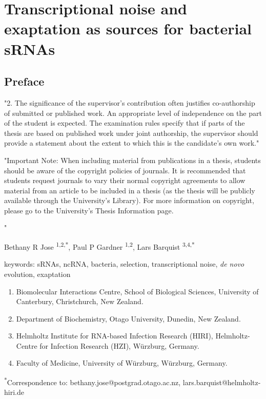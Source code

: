 \chapter{Transcriptional noise and exaptation as sources for bacterial sRNAs}


\section{Preface}
"2.	The significance of the supervisor’s contribution often justifies co-authorship of submitted or published work. An appropriate level of independence on the part of the student is expected. The examination rules specify that if parts of the thesis are based on published work under joint authorship, the supervisor should provide a statement about the extent to which this is the candidate’s own work."
\par
"Important Note: When including material from publications in a thesis, students should be aware of the copyright policies of journals. It is recommended that students request journals to vary their normal copyright agreements to allow material from an article to be included in a thesis (as the thesis will be publicly available through the University’s Library). For more information on copyright, please go to the University’s Thesis Information page.

"

Bethany R Jose \textsuperscript{1,2,*}, Paul P Gardner \textsuperscript{1,2}, Lars Barquist \textsuperscript{3,4,*} 

keywords: sRNAs, ncRNA, bacteria, selection, transcriptional noise, \textit{de novo} evolution, exaptation

\begin{enumerate}
    \item Biomolecular Interactions Centre, School of Biological Sciences, University of Canterbury, Christchurch, New Zealand.
    \item Department of Biochemistry, Otago University, Dunedin, New Zealand.
    \item Helmholtz Institute for RNA-based Infection Research (HIRI), Helmholtz-Centre for Infection Research (HZI), Würzburg, Germany.
    \item Faculty of Medicine, University of Würzburg, Würzburg, Germany. 
\end{enumerate}

\textsuperscript{*}Correspondence to: bethany.jose@postgrad.otago.ac.nz, lars.barquist@helmholtz-hiri.de
